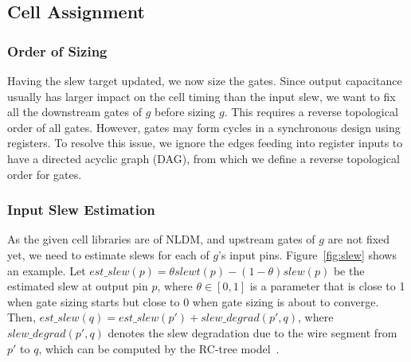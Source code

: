 
\subsection{Cell Assignment}

\subsubsection{Order of Sizing}
\label{sec:sizing_order}

Having the slew target updated, we now size the gates. Since output capacitance usually has larger impact on the cell timing than the input slew, we want to fix all the downstream gates of $g$ before sizing $g$. This requires a reverse topological order of all gates. However, gates may form cycles in a synchronous design using registers. To resolve this issue, we ignore the edges feeding into register inputs to have a directed acyclic graph (DAG), from which we define a reverse topological order for gates.

\subsubsection{Input Slew Estimation}
As the given cell libraries are of NLDM, and upstream gates of $g$ are not fixed yet, we need to estimate slews for each of $g$'s input pins. Figure~\ref{fig:slew} shows an example. Let $est\_slew(p) = \theta slewt(p) - (1-\theta)slew(p)$ be the estimated slew at output pin $p$, where $\theta \in [0,1]$ is a parameter that is close to 1 when gate sizing starts but close to 0 when gate sizing is about to converge. Then, $est\_slew(q) = est\_slew(p') + slew\_degrad(p', q)$, where $slew\_degrad(p', q)$ denotes the slew degradation due to the wire segment from $p'$ to $q$, which can be computed by the RC-tree model~\cite{TAU:Contest}.

